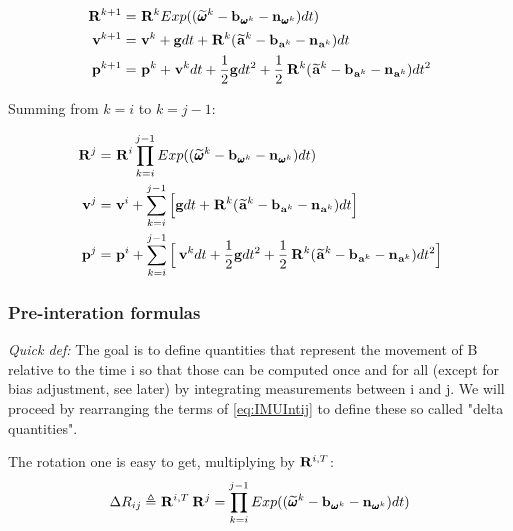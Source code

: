 \documentclass[11pt]{article}
\newcommand{\Rot}[2]{\prescript{#1}{}{\bfR}_{#2}}
\newcommand{\noise}{\bfn}
\newcommand{\bias}{\bfb}
\newcommand{\posi}[2]{\prescript{#1}{}{\bfp}_{#2}}
\newcommand{\vel}[2]{\prescript{#1}{}{\bfv}_{#2}}
\newcommand{\acc}[2]{\prescript{#1}{}{\bfa}_{#2}}
\newcommand{\accm}[2]{\prescript{#1}{}{\widetilde{\bfa}}_{#2}}
\newcommand{\angvel}[2]{\prescript{#1}{}{\pmb{\omega}}_{#2}}
\newcommand{\angvelm}[2]{\prescript{#1}{}{\widetilde{\pmb{\omega}}}_{#2}}
\newcommand{\grav}{\bfg}
\begin{document}
\begin{equation*}
\begin{split}
\Rot{}{}^{k+1}  &= \Rot{}{}^{k}Exp((\angvelm{}{}^k - \bias_{\angvel{}{}^k} - \noise_{\angvel{}{}^k})dt)
\\
\vel{}{}^{k+1}  &= \vel{}{}^{k} + \grav dt + \Rot{}{}^{k}(\accm{}{}^k - \bias_{\acc{}{}^k} - \noise_{\acc{}{}^k})dt
\\
\posi{}{}^{k+1} &= \posi{}{}^{k} + \vel{}{}^{k}dt + \frac{1}{2}\grav dt^2 
+ \frac{1}{2}\Rot{}{}^{k}(\accm{}{}^k - \bias_{\acc{}{}^k} - \noise_{\acc{}{}^k})dt^2
\end{split}
\end{equation*}


Summing from $k=i$ to $k=j-1$:

\begin{equation}
\begin{split}
\Rot{}{}^{j}  &= \Rot{}{}^{i} \prod_{k=i}^{j-1} Exp((\angvelm{}{}^k - \bias_{\angvel{}{}^k} - \noise_{\angvel{}{}^k})dt)
\\
\vel{}{}^{j}  &= \vel{}{}^{i} + \sum_{k=i}^{j-1} \Big[\grav dt + \Rot{}{}^{k}(\accm{}{}^k - \bias_{\acc{}{}^k} - \noise_{\acc{}{}^k})dt \Big]
\\
\posi{}{}^{j} &= \posi{}{}^{i} + \sum_{k=i}^{j-1} \Big[\vel{}{}^{k}dt + \frac{1}{2}\grav dt^2 
+ \frac{1}{2}\Rot{}{}^{k}(\accm{}{}^k - \bias_{\acc{}{}^k} - \noise_{\acc{}{}^k})dt^2 \Big]
\end{split}
\label{eq:IMUIntij}
\end{equation}

\subsubsection{Pre-interation formulas}
\textit{Quick def:} The goal is to define quantities that represent the movement of B relative to the time i so that those can be computed once and for all (except for bias adjustment, see later) by integrating measurements between i and j. We will proceed by rearranging the terms of \ref{eq:IMUIntij} to define these so called "delta quantities".

The rotation one is easy to get, multiplying by $\Rot{}{}^{i,T}$:
\begin{equation}
    \Delta R_{ij} \triangleq \Rot{}{}^{i,T} \Rot{}{}^{j} = \prod_{k=i}^{j-1} Exp((\angvelm{}{}^k - \bias_{\angvel{}{}^k} - \noise_{\angvel{}{}^k})dt)
    \label{eq:IMUDeltaR}
\end{equation}
\end{document}

